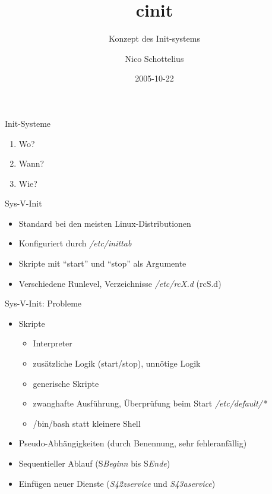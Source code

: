 \documentclass[pdf,autumn,slideColor,colorBG,total]{prosper}
\title{cinit}
\subtitle{Konzept des Init-systems}
\author{Nico Schottelius}
\date{2005-10-22}
\begin{document}
\maketitle
\begin{slide}{Init-Systeme}
\begin{enumerate}
\item Wo?
\item Wann?
\item Wie?
\end{enumerate}
\end{slide}
\begin{slide}{Sys-V-Init}
\begin{itemize}
\item Standard bei den meisten Linux-Distributionen
\item Konfiguriert durch \textit{/etc/inittab}
\item Skripte mit "`start"' und "`stop"' als Argumente
\item Verschiedene Runlevel, Verzeichnisse \textit{/etc/rcX.d} (rcS.d)
\end{itemize}
\end{slide}
\begin{slide}{Sys-V-Init: Probleme}
\begin{itemize}
\item Skripte
\begin{itemize}
   \item Interpreter
   \item zus\"atzliche Logik (start/stop), unn\"otige Logik
   \item generische Skripte
   \item zwanghafte Ausf\"uhrung, \"Uberpr\"ufung beim Start
   \textit{/etc/default/*}
   \item /bin/bash statt kleinere Shell
\end{itemize}
\item Pseudo-Abh\"angigkeiten (durch Benennung, sehr fehleranf\"allig)
\item Sequentieller Ablauf (S\textit{Beginn} bis S\textit{Ende})
\item Einf\"ugen neuer Dienste (\textit{S42zservice} und \textit{S43aservice})
\end{itemize}
\end{slide}
\end{document}
